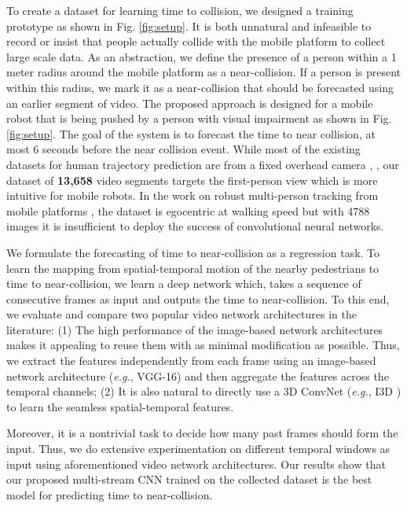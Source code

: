 To create a dataset for learning time to collision, we designed a training prototype as shown in Fig. \ref{fig:setup}. It is both unnatural and infeasible to record or insist that people actually collide with the mobile platform to collect large scale data. As an abstraction, we define the presence of a person within a 1 meter radius around the mobile platform as a near-collision. If a person is present within this radius, we mark it as a near-collision that should be forecasted using an earlier segment of video. The proposed approach is designed for a mobile robot that is being pushed by a person with visual impairment as shown in Fig. \ref{fig:setup}. The goal of the system is to forecast the time to near collision, at most 6 seconds before the near collision event. While most of the existing datasets for human trajectory prediction are from a fixed overhead camera \cite{2009YoullNW}, \cite{UCY}, our dataset of \textbf{13,658} video segments targets the first-person view which is more intuitive for mobile robots. In the work on robust multi-person tracking from mobile platforms \cite{Andreas}, the dataset is egocentric at walking speed but with 4788 images it is insufficient to deploy the success of convolutional neural networks. 


We formulate the forecasting of time to near-collision as a regression task. To learn the mapping from spatial-temporal motion of the nearby pedestrians to time to near-collision, we learn a deep network which, takes a sequence of consecutive frames as input and outputs the time to near-collision. To this end, we evaluate and compare two popular video network architectures in the literature: (1) The high performance of the image-based network architectures makes it appealing to reuse them with as minimal modification as possible. Thus, we extract the features independently from each frame using an image-based network architecture (\emph{e.g.}, VGG-16) and then aggregate the features across the temporal channels; (2) It is also natural to directly use a 3D ConvNet (\emph{e.g.}, I3D \cite{i3d}) to learn the seamless spatial-temporal features.

Moreover, it is a nontrivial task to decide how many past frames should form the input. Thus, we do extensive experimentation on different temporal windows as input using aforementioned video network architectures. Our results show that our proposed multi-stream CNN trained on the collected dataset is the best model for predicting time to near-collision.


